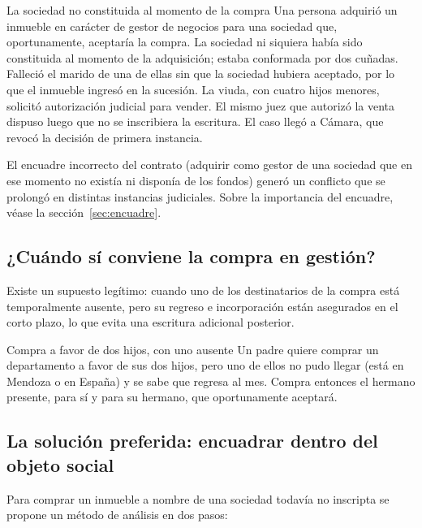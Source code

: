 \documentclass[12pt,oneside]{book}
\begin{document}
\begin{example}{La sociedad no constituida al momento de la compra}
Una persona adquirió un inmueble en carácter de gestor de negocios para una sociedad que, oportunamente, aceptaría la compra. La sociedad ni siquiera había sido constituida al momento de la adquisición; estaba conformada por dos cuñadas. Falleció el marido de una de ellas sin que la sociedad hubiera aceptado, por lo que el inmueble ingresó en la sucesión. La viuda, con cuatro hijos menores, solicitó autorización judicial para vender. El mismo juez que autorizó la venta dispuso luego que no se inscribiera la escritura. El caso llegó a Cámara, que revocó la decisión de primera instancia.

El encuadre incorrecto del contrato (adquirir como gestor de una sociedad que en ese momento no existía ni disponía de los fondos) generó un conflicto que se prolongó en distintas instancias judiciales. Sobre la importancia del encuadre, véase la sección~\ref{sec:encuadre}.
\end{example}

\subsection{¿Cuándo sí conviene la compra en gestión?}

Existe un supuesto legítimo: cuando uno de los destinatarios de la compra está temporalmente ausente, pero su regreso e incorporación están asegurados en el corto plazo, lo que evita una escritura adicional posterior.

\begin{example}{Compra a favor de dos hijos, con uno ausente}
Un padre quiere comprar un departamento a favor de sus dos hijos, pero uno de ellos no pudo llegar (está en Mendoza o en España) y se sabe que regresa al mes. Compra entonces el hermano presente, para sí y para su hermano, que oportunamente aceptará.
\end{example}

\subsection{La solución preferida: encuadrar dentro del objeto social}

Para comprar un inmueble a nombre de una sociedad todavía no inscripta se propone un método de análisis en dos pasos:
\end{document}
